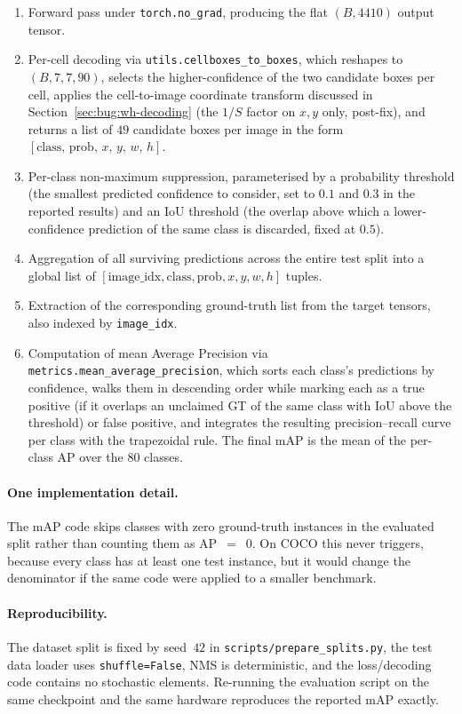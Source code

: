 \begin{enumerate}
    \item Forward pass under \texttt{torch.no\_grad}, producing the flat
        $(B, 4410)$ output tensor.
    \item Per-cell decoding via \texttt{utils.cellboxes\_to\_boxes}, which
        reshapes to $(B, 7, 7, 90)$, selects the higher-confidence of the two
        candidate boxes per cell, applies the cell-to-image coordinate
        transform discussed in Section~\ref{sec:bug:wh-decoding} (the $1/S$
        factor on $x, y$ only, post-fix), and returns a list of $49$ candidate
        boxes per image in the form
        $[\text{class},\,\text{prob},\,x,\,y,\,w,\,h]$.
    \item Per-class non-maximum suppression, parameterised by a probability
        threshold (the smallest predicted confidence to consider, set to
        $0.1$ and $0.3$ in the reported results) and an IoU threshold (the
        overlap above which a lower-confidence prediction of the same class
        is discarded, fixed at $0.5$).
    \item Aggregation of all surviving predictions across the entire test
        split into a global list of $[\text{image\_idx}, \text{class},
        \text{prob}, x, y, w, h]$ tuples.
    \item Extraction of the corresponding ground-truth list from the target
        tensors, also indexed by \texttt{image\_idx}.
    \item Computation of mean Average Precision via
        \texttt{metrics.mean\_average\_precision}, which sorts each class's
        predictions by confidence, walks them in descending order while
        marking each as a true positive (if it overlaps an unclaimed GT of
        the same class with IoU above the threshold) or false positive, and
        integrates the resulting precision--recall curve per class with the
        trapezoidal rule. The final mAP is the mean of the per-class AP over
        the 80 classes.
\end{enumerate}

\paragraph{One implementation detail.} The mAP code skips classes with zero
ground-truth instances in the evaluated split rather than counting them as
AP~$=$~0. On COCO this never triggers, because every class has at least one
test instance, but it would change the denominator if the same code were
applied to a smaller benchmark.

\paragraph{Reproducibility.} The dataset split is fixed by seed~$42$ in
\texttt{scripts/prepare\_splits.py}, the test data loader uses
\texttt{shuffle=False}, NMS is deterministic, and the loss/decoding code
contains no stochastic elements. Re-running the evaluation script on the
same checkpoint and the same hardware reproduces the reported mAP exactly.
